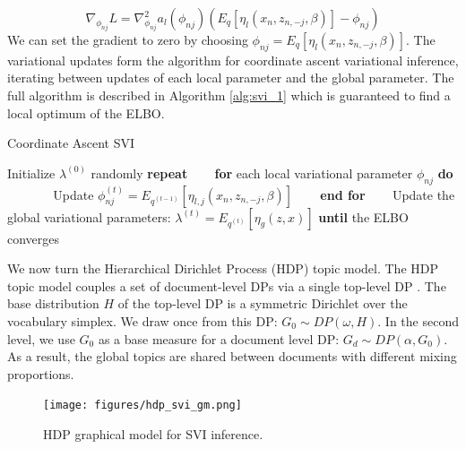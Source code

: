\begin{equation}
   \nabla_{\phi_{nj}}L = \nabla_{\phi_{nj}}^{2}a_{l}(\phi_{nj})(E_q[\eta_l(x_n,z_{n,-j},\beta)] - \phi_{nj})
\end{equation}
We can set the gradient to zero by choosing $\phi_{nj} = E_q[\eta_l(x_n,z_{n,-j},\beta)]$. The variational updates form the algorithm for coordinate ascent variational inference, iterating between updates of each local parameter and the global parameter. The full algorithm is described in Algorithm \ref{alg:svi_1} which is guaranteed to find a local optimum of the ELBO.\\

\begin{algorithm}
\caption{Coordinate Ascent SVI \cite{SVI2013}}
\label{alg:svi_1}
\begin{algorithmic}[1]
\STATE Initialize $\lambda^{(0)}$ randomly
\STATE \textbf{repeat}
\STATE ~~~ \textbf{for} each local variational parameter $\phi_{nj}$ \textbf{do}
\STATE ~~~ ~~~ Update $\phi_{nj}^{(t)} = E_{q^{(t-1)}}[\eta_{l,j}(x_n,z_{n,-j},\beta)]$
\STATE ~~~ \textbf{end for}
\STATE ~~~ Update the global variational parameters: $\lambda^{(t)} = E_{q^{(t)}}[\eta_g(z,x)]$
\STATE \textbf{until} the ELBO converges
\end{algorithmic}
\end{algorithm}

We now turn the Hierarchical Dirichlet Process (HDP) topic model. The HDP topic model couples a set of document-level DPs via a single top-level DP \cite{teh2005jasa}. The base distribution $H$ of the top-level DP is a symmetric Dirichlet over the vocabulary simplex. We draw once from this DP: $G_0 \sim DP(\omega, H)$. In the second level, we use $G_0$ as a base measure for a document level DP: $G_d \sim DP(\alpha, G_0)$. As a result, the global topics are shared between documents with different mixing proportions.

\begin{figure}[tbhp]
    \centering
    \texttt{[image: figures/hdp\_svi\_gm.png]}
    \caption{HDP graphical model for SVI inference.}
    \label{fig:svi_gm2}
\end{figure}

